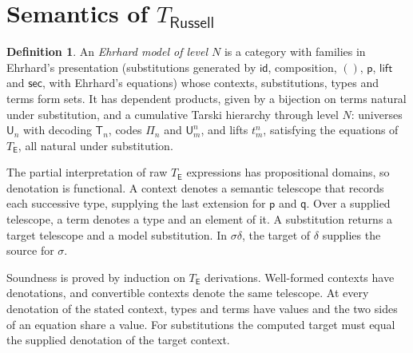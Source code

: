 \documentclass[11pt]{article}
\theoremstyle{definition}
\newtheorem{definition}{Definition}
\theoremstyle{remark}
\newcommand{\U}{\mathsf U}
\newcommand{\T}{\mathsf T}
\newcommand{\p}{\mathsf p}
\newcommand{\q}{\mathsf q}
\newcommand{\id}{\mathsf{id}}
\newcommand{\lift}{\mathsf{lift}}
\newcommand{\sect}{\mathsf{sec}}
\begin{document}
\section{Semantics of $T_{\mathsf{Russell}}$}\label{sec:rsem}

\begin{definition}
An \emph{Ehrhard model of level $N$} is a category with families in
Ehrhard's presentation (substitutions generated by $\id$, composition,
$()$, $\p$, $\lift$ and $\sect$, with Ehrhard's equations) whose
contexts, substitutions, types and terms form sets. It has dependent
products, given by a bijection on terms natural under substitution, and a
cumulative Tarski hierarchy through level $N$: universes $\U_n$ with
decoding $\T_n$, codes $\Pi_n$ and $\U^n_m$, and lifts $t^n_m$, satisfying
the equations of $T_{\mathsf E}$, all natural under substitution.
\end{definition}

The partial interpretation of raw $T_{\mathsf E}$ expressions has
propositional domains, so denotation is functional. A context denotes a
semantic telescope that records each successive type, supplying the last
extension for $\p$ and $\q$. Over a supplied telescope, a term denotes a
type and an element of it. A substitution returns a target telescope
and a model substitution. In $\sigma\delta$, the target of $\delta$
supplies the source for $\sigma$.

Soundness is proved by induction on $T_{\mathsf E}$ derivations.
Well-formed contexts have denotations, and convertible contexts denote the
same telescope. At every denotation of the stated context, types and terms
have values and the two sides of an equation share a value. For substitutions
the computed target must equal the supplied denotation of the target context.
\end{document}
